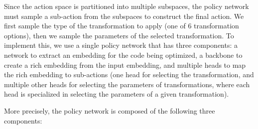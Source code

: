 \documentclass[10pt,twocolumn]{article}
\begin{document}
Since the action space is partitioned into multiple subspaces, the policy network must sample a sub-action from the subspaces to construct the final action. We first sample the type of the transformation to apply (one of 6 transformation options), then we sample the parameters of the selected transformation. To implement this, we use a single policy network that has three components: a network to extract an embedding for the code being optimized, a backbone to create a rich embedding from the input embedding, and multiple heads to map the rich embedding to sub-actions (one head for selecting the transformation, and multiple other heads for selecting the parameters of transformations, where each head is specialized in selecting the parameters of a given transformation).

More precisely, the policy network is composed of the following three components:
\end{document}
